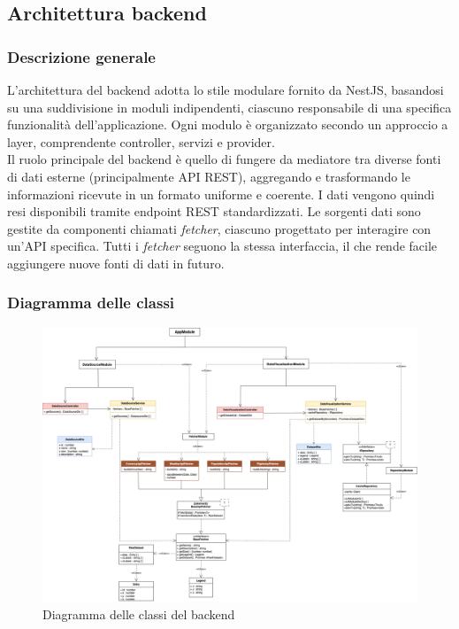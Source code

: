 \subsection{Architettura backend}

\subsubsection{Descrizione generale} 
L’architettura del backend adotta lo stile modulare fornito da NestJS, basandosi su una suddivisione in moduli indipendenti, ciascuno responsabile di una specifica funzionalità dell’applicazione. Ogni modulo è organizzato secondo un approccio a layer, comprendente controller, servizi e provider.\\
Il ruolo principale del backend è quello di fungere da mediatore tra diverse fonti di dati esterne (principalmente API REST), aggregando e trasformando le informazioni ricevute in un formato uniforme e coerente. I dati vengono quindi resi disponibili tramite endpoint REST standardizzati. Le sorgenti dati sono gestite da componenti chiamati \textit{fetcher}, ciascuno progettato per interagire con un'API specifica. Tutti i \textit{fetcher} seguono la stessa interfaccia, il che rende facile aggiungere nuove fonti di dati in futuro.

\subsubsection{Diagramma delle classi}
\begin{figure}[H]
    \begin{center}
        \includegraphics[scale = 0.29]{template/images/uml_back/BackendUML.png}
        \caption{Diagramma delle classi del backend}
    \end{center}     
    
\end{figure}

